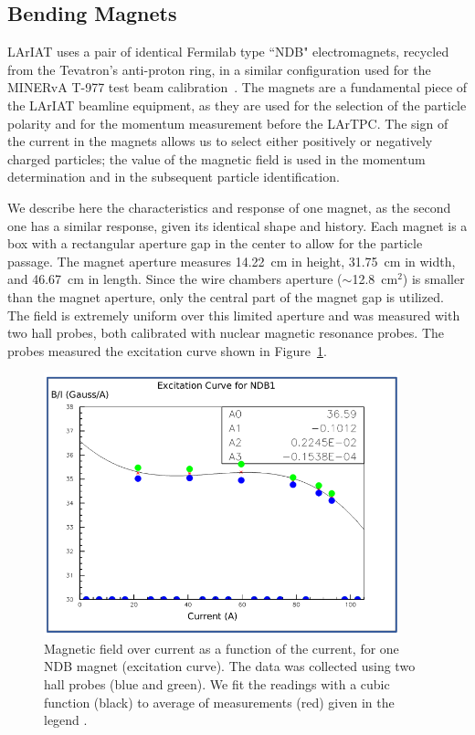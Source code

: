 \subsection{Bending Magnets}\label{sec:Magnets}

LArIAT uses a pair of identical Fermilab type ``NDB" electromagnets, recycled from the Tevatron's anti-proton ring, in a similar configuration used for the  MINERvA T-977 test beam calibration~\cite{MinervaTestbeam}. 
The magnets are a fundamental piece of the LArIAT beamline equipment, as they are used for the selection of the particle polarity and for the momentum measurement before the LArTPC. The sign of the current in the magnets allows us to select either positively or negatively charged particles; the value of the magnetic field is used in the momentum determination and in the subsequent particle identification. 

We describe here the characteristics and response of one magnet, as the second one has a similar response, given its identical shape and history. Each magnet is a box with a rectangular aperture gap in the center to allow for the particle passage.  The magnet aperture measures 14.22~cm in height, 31.75~cm in width, and  46.67~cm in length.  Since the wire chambers aperture ($\sim$12.8~cm$^2$) is smaller than the magnet aperture, only the central part of the magnet gap is utilized. The field is extremely uniform over this limited aperture and was measured with two hall probes, both calibrated with nuclear magnetic resonance probes. The probes measured the excitation curve shown in Figure~\ref{fig:magnet_excitation}. 

\begin{figure}[!h]
\begin{centering}
\vspace{-0.3cm}
\includegraphics[height=3.0in]{Chapter-3/Images/ExcitationCurves.png}
\caption{
{ Magnetic field over current as a function of the current, for one NDB magnet (excitation curve). The data was collected using two hall probes (blue and green). We fit the readings with a cubic function (black) to average of measurements (red) given in the legend \cite{detectorPaper}.}
}
\label{fig:magnet_excitation}
\end{centering}
\end{figure}

